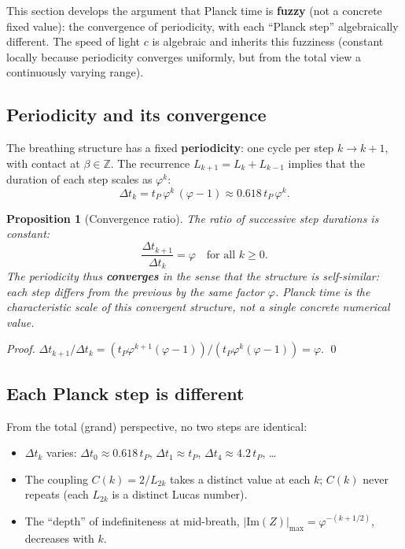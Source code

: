 \documentclass[12pt,a4paper]{article}
\newtheorem{proposition}[theorem]{Proposition}
\begin{document}
This section develops the argument that Planck time is \textbf{fuzzy} (not a concrete fixed value): the convergence of periodicity, with each ``Planck step'' algebraically different. The speed of light $c$ is algebraic and inherits this fuzziness (constant locally because periodicity converges uniformly, but from the total view a continuously varying range).

\subsection{Periodicity and its convergence}

The breathing structure has a fixed \textbf{periodicity}: one cycle per step $k \to k+1$, with contact at $\beta \in \mathbb{Z}$. The recurrence $L_{k+1} = L_k + L_{k-1}$ implies that the duration of each step scales as $\varphi^k$:
\begin{equation}
\Delta t_k = t_P\,\varphi^k\,(\varphi - 1) \approx 0.618\,t_P\,\varphi^k.
\label{eq:dt-k}
\end{equation}

\begin{proposition}[Convergence ratio]
\label{prop:convergence-ratio}
The ratio of successive step durations is constant:
\begin{equation}
\frac{\Delta t_{k+1}}{\Delta t_k} = \varphi \quad \text{for all } k \geq 0.
\end{equation}
The periodicity thus \textbf{converges} in the sense that the structure is self-similar: each step differs from the previous by the same factor $\varphi$. Planck time is the characteristic scale of this convergent structure, not a single concrete numerical value.
\end{proposition}

\begin{proof}
$\Delta t_{k+1}/\Delta t_k = (t_P\varphi^{k+1}(\varphi-1))/(t_P\varphi^k(\varphi-1)) = \varphi$. \qed
\end{proof}

\subsection{Each Planck step is different}

From the total (grand) perspective, no two steps are identical:
\begin{itemize}[nosep]
\item $\Delta t_k$ varies: $\Delta t_0 \approx 0.618\,t_P$, $\Delta t_1 \approx t_P$, $\Delta t_4 \approx 4.2\,t_P$, \ldots
\item The coupling $C(k) = 2/L_{2k}$ takes a distinct value at each $k$; $C(k)$ never repeats (each $L_{2k}$ is a distinct Lucas number).
\item The ``depth'' of indefiniteness at mid-breath, $|\mathrm{Im}(Z)|_{\max} = \varphi^{-(k+1/2)}$, decreases with $k$.
\end{itemize}
\end{document}
